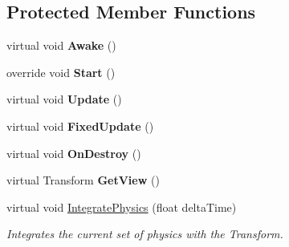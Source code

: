 \subsection*{Protected Member Functions}
\begin{DoxyCompactItemize}
\item 
\hypertarget{class_skyrates_1_1_common_1_1_entity_1_1_entity_dynamic_a2364ce439984919790139305d2d2f91b}{virtual void {\bfseries Awake} ()}\label{class_skyrates_1_1_common_1_1_entity_1_1_entity_dynamic_a2364ce439984919790139305d2d2f91b}

\item 
\hypertarget{class_skyrates_1_1_common_1_1_entity_1_1_entity_dynamic_a0e3f4c361734de124f27ed7d331bd12c}{override void {\bfseries Start} ()}\label{class_skyrates_1_1_common_1_1_entity_1_1_entity_dynamic_a0e3f4c361734de124f27ed7d331bd12c}

\item 
\hypertarget{class_skyrates_1_1_common_1_1_entity_1_1_entity_dynamic_ac2da66eb8b689427a0821da3e27452b4}{virtual void {\bfseries Update} ()}\label{class_skyrates_1_1_common_1_1_entity_1_1_entity_dynamic_ac2da66eb8b689427a0821da3e27452b4}

\item 
\hypertarget{class_skyrates_1_1_common_1_1_entity_1_1_entity_dynamic_adc9f4729654d4c86a404c0ccd966ccd3}{virtual void {\bfseries Fixed\-Update} ()}\label{class_skyrates_1_1_common_1_1_entity_1_1_entity_dynamic_adc9f4729654d4c86a404c0ccd966ccd3}

\item 
\hypertarget{class_skyrates_1_1_common_1_1_entity_1_1_entity_dynamic_a29fdd6f0b967349e6b9efb695f74a647}{virtual void {\bfseries On\-Destroy} ()}\label{class_skyrates_1_1_common_1_1_entity_1_1_entity_dynamic_a29fdd6f0b967349e6b9efb695f74a647}

\item 
\hypertarget{class_skyrates_1_1_common_1_1_entity_1_1_entity_dynamic_a7d214d221e4933f54528a707da1cc129}{virtual Transform {\bfseries Get\-View} ()}\label{class_skyrates_1_1_common_1_1_entity_1_1_entity_dynamic_a7d214d221e4933f54528a707da1cc129}

\item 
virtual void \hyperlink{class_skyrates_1_1_common_1_1_entity_1_1_entity_dynamic_a994dbf8d2f10ff4398dbf2f68049205a}{Integrate\-Physics} (float delta\-Time)
\begin{DoxyCompactList}\small\item\em Integrates the current set of physics with the Transform. \end{DoxyCompactList}\end{DoxyCompactItemize}
